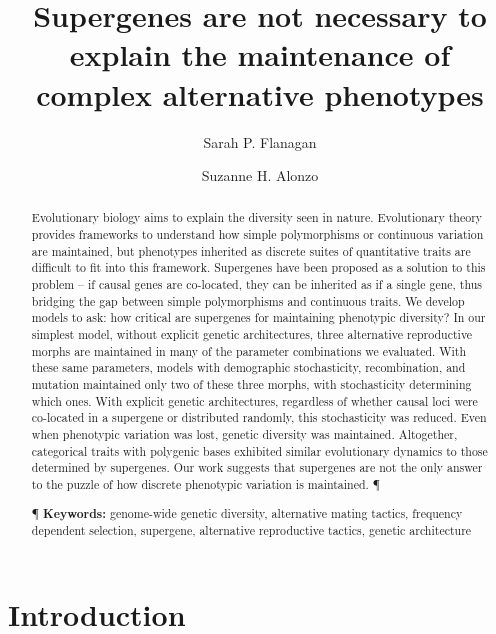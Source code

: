 \documentclass[
  11pt,
  a4paper,
]{article}
\author[1,*]{Sarah P. Flanagan}
\author[2]{Suzanne H. Alonzo}
\affil[1]{\footnotesize School of Biological Sciences, University of Canterbury}
\affil[2]{\footnotesize Department of Ecology and Evolutionary Biology, University of California Santa Cruz}
\affil[*]{Corresponding author: spflanagan.phd@gmail.com}
\title{Supergenes are not necessary to explain the maintenance of complex alternative phenotypes}
\date{\vspace{-2.5em}}
\begin{document}
\maketitle
\begin{abstract}
Evolutionary biology aims to explain the diversity seen in nature. Evolutionary theory provides frameworks to understand how simple polymorphisms or continuous variation are maintained, but phenotypes inherited as discrete suites of quantitative traits are difficult to fit into this framework. Supergenes have been proposed as a solution to this problem -- if causal genes are co-located, they can be inherited as if a single gene, thus bridging the gap between simple polymorphisms and continuous traits. We develop models to ask: how critical are supergenes for maintaining phenotypic diversity? In our simplest model, without explicit genetic architectures, three alternative reproductive morphs are maintained in many of the parameter combinations we evaluated. With these same parameters, models with demographic stochasticity, recombination, and mutation maintained only two of these three morphs, with stochasticity determining which ones. With explicit genetic architectures, regardless of whether causal loci were co-located in a supergene or distributed randomly, this stochasticity was reduced. Even when phenotypic variation was lost, genetic diversity was maintained. Altogether, categorical traits with polygenic bases exhibited similar evolutionary dynamics to those determined by supergenes. Our work suggests that supergenes are not the only answer to the puzzle of how discrete phenotypic variation is maintained. ¶ \par ¶ \textbf{Keywords:} genome-wide genetic diversity, alternative mating tactics, frequency dependent selection, supergene, alternative reproductive tactics, genetic architecture
\end{abstract}

\hypertarget{introduction}{%
\section{Introduction}\label{introduction}}
\end{document}
